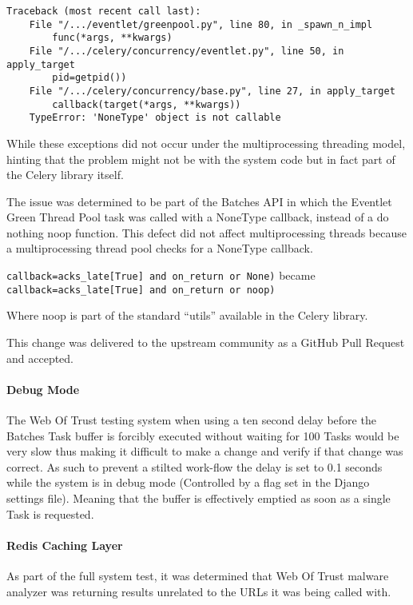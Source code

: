 \begin{verbatim}
Traceback (most recent call last):
    File "/.../eventlet/greenpool.py", line 80, in _spawn_n_impl
        func(*args, **kwargs)
    File "/.../celery/concurrency/eventlet.py", line 50, in apply_target
        pid=getpid())
    File "/.../celery/concurrency/base.py", line 27, in apply_target
        callback(target(*args, **kwargs))
    TypeError: 'NoneType' object is not callable
\end{verbatim}

While these exceptions did not occur under the multiprocessing threading model, hinting that the problem might not be with the system code but in fact part of the Celery library itself.

The issue was determined to be part of the Batches API in which the Eventlet Green Thread Pool task was called with a NoneType callback, instead of a do nothing noop function.  This defect did not affect multiprocessing threads because a multiprocessing thread pool checks for a NoneType callback.

\verb`callback=acks_late[True] and on_return or None)`
became
\verb`callback=acks_late[True] and on_return or noop)`

Where noop is part of the standard ``utils'' available in the Celery library.

This change was delivered to the upstream community as a GitHub Pull Request and accepted\cite{celery-batches-fix}.

\paragraph{Debug Mode}
The Web Of Trust testing system when using a ten second delay before the Batches Task buffer is forcibly executed without waiting for 100 Tasks would be very slow thus making it difficult to make a change and verify if that change was correct. As such to prevent a stilted work-flow the delay is set to 0.1 seconds while the system is in debug mode (Controlled by a flag set in the Django settings file).  Meaning that the buffer is effectively emptied as soon as a single Task is requested.
\paragraph{Redis Caching Layer}
As part of the full system test, it was determined that Web Of Trust malware analyzer was returning results unrelated to the URLs it was being called with.

